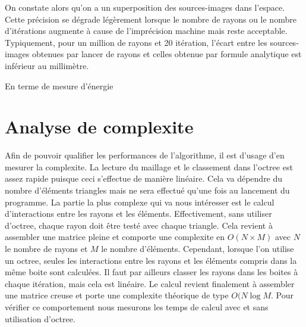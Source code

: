 On constate alors qu'on a un superposition des sources-images dans l'espace. Cette précision se dégrade légèrement lorsque le nombre de rayons ou le nombre d'itérations augmente à cause de l'imprécision machine mais reste acceptable. Typiquement, pour un million de rayons et 20 itération, l'écart entre les sources-images obtenues par lancer de rayons et celles obtenue par formule analytique est inférieur au millimètre.

En terme de mesure d'énergie
		
\section{Analyse de \gls{complexite}} \label{complexite}

Afin de pouvoir qualifier les performances de l'algorithme, il est d'usage d'en mesurer la \gls{complexite}. La lecture du maillage et le classement dans l'\gls{octree} est assez rapide puisque ceci s'effectue de manière linéaire. Cela va dépendre du nombre d'éléments triangles mais ne sera effectué qu'une fois au lancement du programme. La partie la plus complexe qui va nous intéresser est le calcul d'interactions entre les rayons et les éléments. Effectivement, sans utiliser d'\gls{octree}, chaque rayon doit être testé avec chaque triangle. Cela revient à assembler une matrice pleine et comporte une \gls{complexite} en $O(N \times M)$ avec $N$ le nombre de rayons et $M$ le nombre d'éléments. Cependant, lorsque l'on utilise un \gls{octree}, seules les interactions entre les rayons et les éléments compris dans la même boite sont calculées. Il faut par ailleurs classer les rayons dans les boites à chaque itération, mais cela est linéaire. Le calcul revient finalement à assembler une matrice creuse et porte une \gls{complexite} théorique de type $O(N\log{M}$. 
Pour vérifier ce comportement nous mesurons les temps de calcul avec et sans utilisation d'\gls{octree}.


